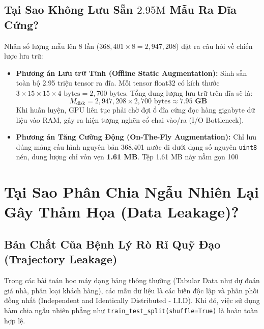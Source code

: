 \documentclass[11pt,a4paper]{report}
\begin{document}
\section{Tại Sao Không Lưu Sẵn $2.95\text{M}$ Mẫu Ra Đĩa Cứng?}

Nhân số lượng mẫu lên 8 lần ($368{,}401 \times 8 = 2{,}947{,}208$) đặt ra câu hỏi về chiến lược lưu trữ:
\begin{itemize}
    \item \textbf{Phương án Lưu trữ Tĩnh (Offline Static Augmentation):} Sinh sẵn toàn bộ 2.95 triệu tensor ra đĩa. Mỗi tensor float32 có kích thước $3 \times 15 \times 15 \times 4\text{ bytes} = 2{,}700\text{ bytes}$. Tổng dung lượng lưu trữ trên đĩa sẽ là:
    \begin{equation}
        M_{\text{disk}} = 2{,}947{,}208 \times 2{,}700\text{ bytes} \approx \mathbf{7.95\text{ GB}}
    \end{equation}
    Khi huấn luyện, GPU liên tục phải chờ đợi ổ đĩa cứng đọc hàng gigabyte dữ liệu vào RAM, gây ra hiện tượng nghẽn cổ chai vào/ra (I/O Bottleneck).
    \item \textbf{Phương án Tăng Cường Động (On-The-Fly Augmentation):} Chỉ lưu đúng mảng cấu hình nguyên bản 368,401 nước đi dưới dạng số nguyên \texttt{uint8} nén, dung lượng chỉ vỏn vẹn \textbf{1.61 MB}. Tệp 1.61 MB này nằm gọn 100%
\end{itemize}

\chapter{Tại Sao Phân Chia Ngẫu Nhiên Lại Gây Thảm Họa (Data Leakage)?}

\section{Bản Chất Của Bệnh Lý Rò Rỉ Quỹ Đạo (Trajectory Leakage)}

Trong các bài toán học máy dạng bảng thông thường (Tabular Data như dự đoán giá nhà, phân loại khách hàng), các mẫu dữ liệu là các biến độc lập và phân phối đồng nhất (Independent and Identically Distributed - I.I.D). Khi đó, việc sử dụng hàm chia ngẫu nhiên phẳng như \texttt{train\_test\_split(shuffle=True)} là hoàn toàn hợp lệ.
\end{document}

